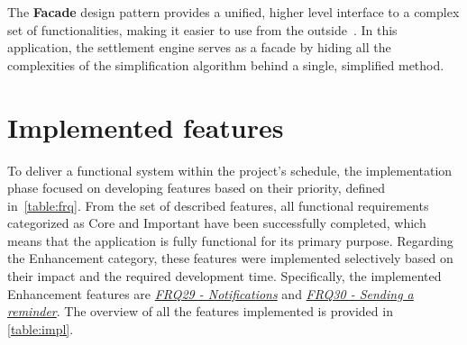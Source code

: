 \documentclass{ctuthesis}
\begin{document}
The \textbf{Facade} design pattern provides a unified, higher level interface to a complex set of functionalities, making it easier to use from the outside~\cite{gof}. In this application, the settlement engine serves as a facade by hiding all the complexities of the simplification algorithm behind a single, simplified method.

\section{Implemented features}
To deliver a functional system within the project's schedule, the implementation phase focused on developing features based on their priority, defined in~\autoref{table:frq}. From the set of described features, all functional requirements categorized as Core and Important have been successfully completed, which means that the application is fully functional for its primary purpose. Regarding the Enhancement category, these features were implemented selectively based on their impact and the required development time. Specifically, the implemented Enhancement features are \emph{\hyperref[frq:29]{FRQ29 - Notifications}} and \emph{\hyperref[frq:30]{FRQ30 - Sending a reminder}}. The overview of all the features implemented is provided in \autoref{table:impl}.
\end{document}
